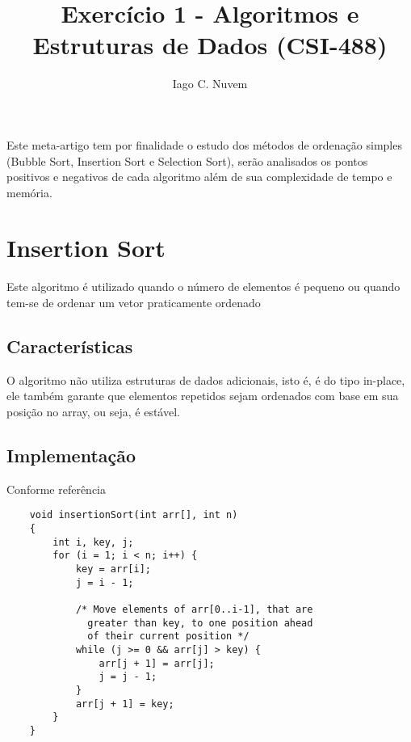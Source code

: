 \documentclass[12pt]{article}
\title{Exercício 1 - Algoritmos e Estruturas de Dados (CSI-488)}
\author{Iago C. Nuvem\inst{2}}
\begin{document}
 

\lstset{language=C}
\maketitle

\begin{resumo} 
  Este meta-artigo tem por finalidade o estudo dos métodos de
  ordenação simples (Bubble Sort, Insertion Sort e Selection Sort),
  serão analisados os pontos positivos e negativos de cada algoritmo
  além de sua complexidade de tempo e memória.
  
\end{resumo}


\section{Insertion Sort}
Este algoritmo é utilizado quando o número de elementos é pequeno ou quando tem-se de ordenar um vetor praticamente ordenado
\subsection{Características}
O algoritmo não utiliza estruturas de dados adicionais, isto é, é do tipo in-place, ele também garante que elementos repetidos sejam ordenados com base em sua posição no array, ou seja, é estável.
\subsection{Implementação}
    Conforme referência \cite{insertionSort}
    \begin{lstlisting}
    void insertionSort(int arr[], int n) 
    { 
        int i, key, j; 
        for (i = 1; i < n; i++) { 
            key = arr[i]; 
            j = i - 1; 
      
            /* Move elements of arr[0..i-1], that are 
              greater than key, to one position ahead 
              of their current position */
            while (j >= 0 && arr[j] > key) { 
                arr[j + 1] = arr[j]; 
                j = j - 1; 
            } 
            arr[j + 1] = key; 
        } 
    } 
    \end{lstlisting}
\end{document}
